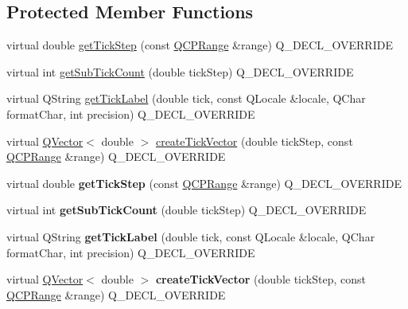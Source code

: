 \subsection*{Protected Member Functions}
\begin{DoxyCompactItemize}
\item 
virtual double \hyperlink{class_q_c_p_axis_ticker_text_a628f16c41905e8c95c6622d6757a38c4}{get\+Tick\+Step} (const \hyperlink{class_q_c_p_range}{Q\+C\+P\+Range} \&range) Q\+\_\+\+D\+E\+C\+L\+\_\+\+O\+V\+E\+R\+R\+I\+DE
\item 
virtual int \hyperlink{class_q_c_p_axis_ticker_text_a9c2488b877776870239abda4c8106052}{get\+Sub\+Tick\+Count} (double tick\+Step) Q\+\_\+\+D\+E\+C\+L\+\_\+\+O\+V\+E\+R\+R\+I\+DE
\item 
virtual Q\+String \hyperlink{class_q_c_p_axis_ticker_text_a99247779a9c20bea1f50911117540a71}{get\+Tick\+Label} (double tick, const Q\+Locale \&locale, Q\+Char format\+Char, int precision) Q\+\_\+\+D\+E\+C\+L\+\_\+\+O\+V\+E\+R\+R\+I\+DE
\item 
virtual \hyperlink{class_q_vector}{Q\+Vector}$<$ double $>$ \hyperlink{class_q_c_p_axis_ticker_text_aa195c4fd0364d0393f1798fb495d6a60}{create\+Tick\+Vector} (double tick\+Step, const \hyperlink{class_q_c_p_range}{Q\+C\+P\+Range} \&range) Q\+\_\+\+D\+E\+C\+L\+\_\+\+O\+V\+E\+R\+R\+I\+DE
\item 
virtual double {\bfseries get\+Tick\+Step} (const \hyperlink{class_q_c_p_range}{Q\+C\+P\+Range} \&range) Q\+\_\+\+D\+E\+C\+L\+\_\+\+O\+V\+E\+R\+R\+I\+DE\hypertarget{class_q_c_p_axis_ticker_text_aa220d42ce46debd93a759440c2214a33}{}\label{class_q_c_p_axis_ticker_text_aa220d42ce46debd93a759440c2214a33}

\item 
virtual int {\bfseries get\+Sub\+Tick\+Count} (double tick\+Step) Q\+\_\+\+D\+E\+C\+L\+\_\+\+O\+V\+E\+R\+R\+I\+DE\hypertarget{class_q_c_p_axis_ticker_text_ac899dad500213b5c488033071723e97d}{}\label{class_q_c_p_axis_ticker_text_ac899dad500213b5c488033071723e97d}

\item 
virtual Q\+String {\bfseries get\+Tick\+Label} (double tick, const Q\+Locale \&locale, Q\+Char format\+Char, int precision) Q\+\_\+\+D\+E\+C\+L\+\_\+\+O\+V\+E\+R\+R\+I\+DE\hypertarget{class_q_c_p_axis_ticker_text_adb3da2374ca0b62ff1d648097ae17e8a}{}\label{class_q_c_p_axis_ticker_text_adb3da2374ca0b62ff1d648097ae17e8a}

\item 
virtual \hyperlink{class_q_vector}{Q\+Vector}$<$ double $>$ {\bfseries create\+Tick\+Vector} (double tick\+Step, const \hyperlink{class_q_c_p_range}{Q\+C\+P\+Range} \&range) Q\+\_\+\+D\+E\+C\+L\+\_\+\+O\+V\+E\+R\+R\+I\+DE\hypertarget{class_q_c_p_axis_ticker_text_aee843a6f6f00ba80e825f2acb224c1e9}{}\label{class_q_c_p_axis_ticker_text_aee843a6f6f00ba80e825f2acb224c1e9}

\end{DoxyCompactItemize}
